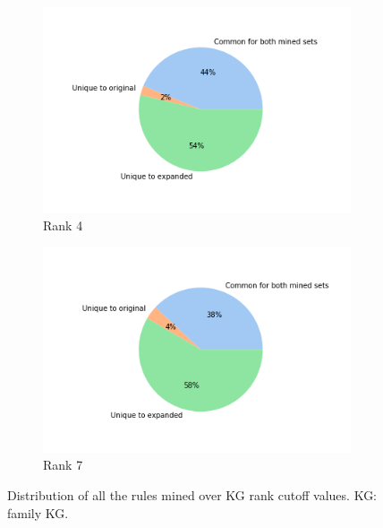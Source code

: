 \begin{figure}[!htbp]
        \begin{subfigure}[b]{0.3\textwidth}  
            \centering 
            \includegraphics[width=\textwidth]{figures/results/ranks/pie_charts/('rank_cutoff', 4)_family.png}
            \caption[]%
            {{\small Rank 4}}    
            \label{fig:rank_4_pie_family}
        \end{subfigure}
        \begin{subfigure}[b]{0.3\textwidth}   
            \centering 
            \includegraphics[width=\textwidth]{figures/results/ranks/pie_charts/('rank_cutoff', 7)_family.png}
            \caption[]%
            {{\small Rank 7}}    
            \label{fig:rank_7_pie_family}
        \end{subfigure}
        \caption[Distribution of rules over KG rank cutoff values - family KG.]
        {\small Distribution of all the rules mined over KG rank cutoff values. KG: family KG.} 
        \label{rank_pies_family}
    \end{figure}
    
